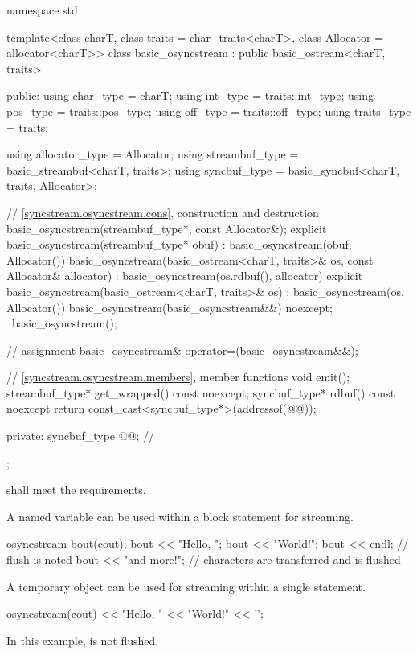 %
\begin{codeblock}
namespace std {
  template<class charT, class traits = char_traits<charT>, class Allocator = allocator<charT>>
  class basic_osyncstream : public basic_ostream<charT, traits> {
  public:
    using char_type   = charT;
    using int_type    = traits::int_type;
    using pos_type    = traits::pos_type;
    using off_type    = traits::off_type;
    using traits_type = traits;

    using allocator_type = Allocator;
    using streambuf_type = basic_streambuf<charT, traits>;
    using syncbuf_type   = basic_syncbuf<charT, traits, Allocator>;

    // \ref{syncstream.osyncstream.cons}, construction and destruction
    basic_osyncstream(streambuf_type*, const Allocator&);
    explicit basic_osyncstream(streambuf_type* obuf)
      : basic_osyncstream(obuf, Allocator()) {}
    basic_osyncstream(basic_ostream<charT, traits>& os, const Allocator& allocator)
      : basic_osyncstream(os.rdbuf(), allocator) {}
    explicit basic_osyncstream(basic_ostream<charT, traits>& os)
      : basic_osyncstream(os, Allocator()) {}
    basic_osyncstream(basic_osyncstream&&) noexcept;
    ~basic_osyncstream();

    // assignment
    basic_osyncstream& operator=(basic_osyncstream&&);

    // \ref{syncstream.osyncstream.members}, member functions
    void emit();
    streambuf_type* get_wrapped() const noexcept;
    syncbuf_type* rdbuf() const noexcept { return const_cast<syncbuf_type*>(addressof(@@)); }

  private:
    syncbuf_type @@;    // \expos
  };
}
\end{codeblock}

\pnum
{} shall meet
the  requirements.

\pnum
\begin{example}
A named variable can be used within a block statement for streaming.
\begin{codeblock}
{
  osyncstream bout(cout);
  bout << "Hello, ";
  bout << "World!";
  bout << endl; // flush is noted
  bout << "and more!\n";
}   // characters are transferred and  is flushed
\end{codeblock}
\end{example}

\pnum
\begin{example}
A temporary object can be used for streaming within a single statement.
\begin{codeblock}
osyncstream(cout) << "Hello, " << "World!" << '\n';
\end{codeblock}
In this example,  is not flushed.
\end{example}

